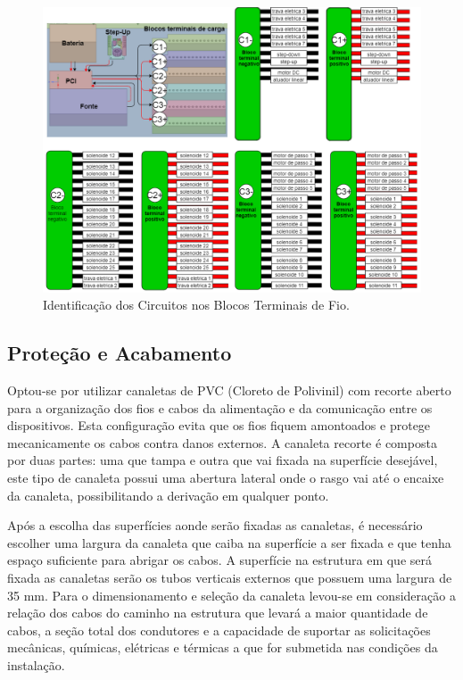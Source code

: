 \begin{figure}[!htb]
    \centering
     \includegraphics[width=1\textwidth, height=2\textheight,keepaspectratio]{figuras/energia/diagramas/etiquetagem.png}
    \caption{Identificação dos Circuitos nos Blocos Terminais de Fio.}
    \label{fig:diagrama_etiqueta}
\end{figure}

\subsection{Proteção e Acabamento}
\label{energia_subseção_cabos}

Optou-se por utilizar canaletas de PVC (Cloreto de Polivinil) com recorte aberto para a organização dos fios e cabos da alimentação e da comunicação entre os dispositivos. Esta configuração evita que os fios fiquem amontoados e protege mecanicamente os cabos contra danos externos. A canaleta recorte é composta por duas partes: uma que tampa e outra que vai fixada na superfície desejável, este tipo de canaleta possui uma abertura lateral onde o rasgo vai até o encaixe da canaleta, possibilitando a derivação em qualquer ponto.

Após a escolha das superfícies aonde serão fixadas as canaletas, é necessário escolher uma largura da canaleta que caiba na superfície a ser fixada e que tenha espaço suficiente para abrigar os cabos. A superfície na estrutura em que será fixada as canaletas serão os tubos verticais externos que possuem uma largura de 35 mm. Para o dimensionamento e seleção da canaleta levou-se em consideração a relação dos cabos do caminho na estrutura que levará a maior quantidade de cabos, a seção total dos condutores e a capacidade de suportar as solicitações mecânicas, químicas, elétricas e térmicas a que for submetida nas condições da instalação. 

